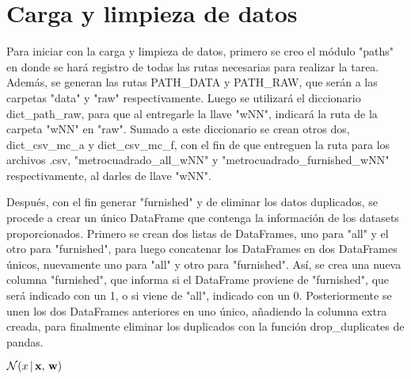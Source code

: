 \section{Carga y limpieza de datos}

Para iniciar con la carga y limpieza de datos, primero se creo el módulo "paths" en donde se hará registro de todas las rutas necesarias para realizar la tarea. Además, se generan las rutas PATH\_DATA y PATH\_RAW, que serán a las carpetas "data" y "raw" respectivamente. Luego se utilizará el diccionario dict\_path\_raw, para que al entregarle la llave "wNN", indicará la ruta de la carpeta "wNN" en "raw". Sumado a este diccionario se crean otros dos, dict\_csv\_mc\_a y dict\_csv\_mc\_f, con el fin de que entreguen la ruta para los archivos .csv, "metrocuadrado\_all\_wNN" y "metrocuadrado\_furnished\_wNN" respectivamente, al darles de llave "wNN".

Después, con el fin generar "furnished" y de eliminar los datos duplicados, se procede a crear un único DataFrame que contenga la información de los datasets proporcionados. Primero se crean dos listas de DataFrames, uno para "all" y el otro para "furnished", para luego concatenar los DataFrames en dos DataFrames únicos, nuevamente uno para "all" y otro para "furnished". Así, se crea una nueva columna "furnished", que informa si el DataFrame proviene de "furnished", que será indicado con un 1, o si viene de "all", indicado con un 0. Posteriormente se unen los dos DataFrames anteriores en uno único, añadiendo la columna extra creada, para finalmente eliminar los duplicados con la función drop_duplicates de pandas.

$\mathcal{N} (x \, |\, \mathbf{x},\, \mathbf{w})$
